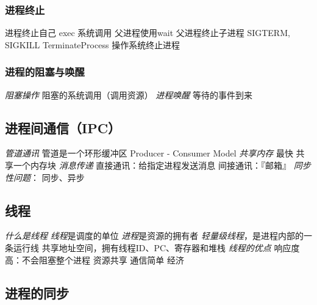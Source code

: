 \documentclass{ctexart}
\begin{document}
\subsubsection{进程终止}
\begin{outline}
    \1 进程终止自己 exec 系统调用
        \2 父进程使用wait
    \1 父进程终止子进程
        \2 SIGTERM, SIGKILL
        \2 TerminateProcess
    \1 操作系统终止进程
\end{outline}
\subsubsection{进程的阻塞与唤醒}
\begin{outline}
    \1 \emph{阻塞操作} 阻塞的系统调用（调用资源）
    \1 \emph{进程唤醒} 等待的事件到来
\end{outline}
\subsection{进程间通信（IPC）}
\begin{outline}
    \1 \emph{管道通讯}
        \2 管道是一个环形缓冲区
        \2 Producer - Consumer Model
    \1 \emph{共享内存}
        \2 最快
        \2 共享一个内存块
    \1 \emph{消息传递}
        \2 直接通讯：给指定进程发送消息
        \2 间接通讯：『邮箱』
    \1 \emph{同步性问题}： 同步、异步
\end{outline}
\subsection{线程}
\begin{outline}
    \1 \emph{什么是线程}
        \2 \emph{线程}是调度的单位
        \2 \emph{进程}是资源的拥有者
        \2 \emph{轻量级线程}，是进程内部的一条运行线
        \2 共享地址空间，拥有线程ID、PC、寄存器和堆栈
    \1 \emph{线程的优点}
        \2 响应度高：不会阻塞整个进程
        \2 资源共享
        \2 通信简单
        \2 经济
\end{outline}
\subsection{进程的同步}
\end{document}
